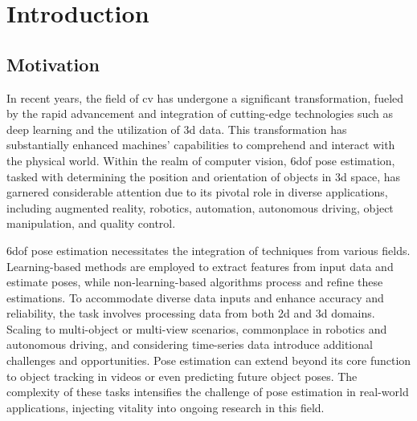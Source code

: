 \documentclass[12pt,DIV14,BCOR12mm,a4paper,footinclude=false,headinclude,parskip=half-,twoside,openright,cleardoublepage=empty,toc=index,bibliography=totoc,listof=totoc]{scrreprt}
\title{\maintitle}%
\subtitle{\translatedtitle}
\author{
\large
  \ifthenelse{\equal{\doclang}{german}}{
  \begin{tabular}{rp{7cm}}
    \Large 
    Autor:      & \Large \student \vspace*{2mm}\\
    Ausgabe:    & \startdate \\
    Abgabe:     & \submission \vspace*{3mm}\\
    Betreuer:   & \tutor \vspace*{2mm}\\
    Stichworte: & \keywords
  \end{tabular}
  }{
  \begin{tabular}{rp{7cm}}
    \Large 
    Author:             & \Large \student \vspace*{2mm}\\
    Date of work begin: & \startdate \\
    Date of submission: & \submission \vspace*{3mm}\\
    Supervisor:         & \tutor \vspace*{2mm}\\
    Keywords:           & \keywords
  \end{tabular}
  }
  \bugfix
}
\date{}
\numberwithin{equation}{chapter}
\begin{document}
\maketitle
\cleardoublepage
{} %
\tableofcontents
\cleardoublepage
\setcounter{page}{1}




\setlength\LTleft{-5pt}
\printglossary[type=\acronymtype,title=List of Acronyms,nonumberlist,style=custom_acronyms]

\printnomenclature

\chapter{Introduction}
\section{Motivation}
In recent years, the field of \gls{cv} has undergone a significant transformation, fueled by the rapid advancement and integration of cutting-edge technologies such as deep learning and the utilization of \gls{3d} data. This transformation has substantially enhanced machines' capabilities to comprehend and interact with the physical world. Within the realm of computer vision, \gls{6dof} pose estimation, tasked with determining the position and orientation of objects in \gls{3d} space, has garnered considerable attention due to its pivotal role in diverse applications, including augmented reality, robotics, automation, autonomous driving, object manipulation, and quality control.

\gls{6dof} pose estimation necessitates the integration of techniques from various fields. Learning-based methods are employed to extract features from input data and estimate poses, while non-learning-based algorithms process and refine these estimations. To accommodate diverse data inputs and enhance accuracy and reliability, the task involves processing data from both \gls{2d} and \gls{3d} domains. Scaling to multi-object or multi-view scenarios, commonplace in robotics and autonomous driving, and considering time-series data introduce additional challenges and opportunities. Pose estimation can extend beyond its core function to object tracking in videos or even predicting future object poses. The complexity of these tasks intensifies the challenge of pose estimation in real-world applications, injecting vitality into ongoing research in this field.
\end{document}
